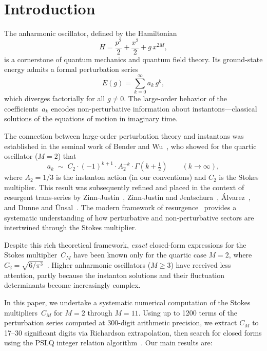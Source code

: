 \documentclass[12pt,a4paper]{article}
\numberwithin{equation}{section}
\theoremstyle{plain}
\theoremstyle{definition}
\theoremstyle{remark}
\begin{document}
\bigskip

\section{Introduction}
\label{sec:intro}

The anharmonic oscillator, defined by the Hamiltonian
\begin{equation}\label{eq:H}
  H = \frac{p^2}{2} + \frac{x^2}{2} + g\,x^{2M},
\end{equation}
is a cornerstone of quantum mechanics and quantum field theory. Its ground-state
energy admits a formal perturbation series
\begin{equation}\label{eq:Eg}
  E(g) = \sum_{k=0}^{\infty} a_k \, g^k,
\end{equation}
which diverges factorially for all $g \ne 0$. The large-order behavior of
the coefficients~$a_k$ encodes non-perturbative information about instantons---classical
solutions of the equations of motion in imaginary time.

The connection between large-order perturbation theory and instantons was
established in the seminal work of Bender and Wu~\cite{BW1969,BW1973}, who
showed for the quartic oscillator ($M=2$) that
\begin{equation}\label{eq:large-order-M2}
  a_k \;\sim\; C_2 \cdot (-1)^{k+1} \cdot A_2^{-k} \cdot \Gamma(k + \tfrac{1}{2})
  \qquad (k \to \infty),
\end{equation}
where $A_2 = 1/3$ is the instanton action (in our conventions) and $C_2$ is
the Stokes multiplier. This result was subsequently refined and placed in the
context of resurgent trans-series by Zinn-Justin~\cite{ZJ2004},
Zinn-Justin and Jentschura~\cite{ZJJ2004}, \'Alvarez~\cite{Alvarez2004},
and Dunne and \"Unsal~\cite{DU2016}. The modern framework of
resurgence~\cite{Dorigoni2019,ABS2019} provides a systematic understanding
of how perturbative and non-perturbative sectors are intertwined through
the Stokes multiplier.

Despite this rich theoretical framework, \emph{exact} closed-form expressions
for the Stokes multiplier~$C_M$ have been known only for the quartic case
$M = 2$, where $C_2 = \sqrt{6/\pi^3}$~\cite{ZJJ2004}. Higher anharmonic
oscillators ($M \ge 3$) have received less attention, partly because the
instanton solutions and their fluctuation determinants become increasingly
complex.

In this paper, we undertake a systematic numerical computation of the
Stokes multipliers~$C_M$ for $M = 2$ through $M = 11$. Using up to 1200
terms of the perturbation series computed at 300-digit arithmetic precision,
we extract $C_M$ to 17--30 significant digits via Richardson extrapolation,
then search for closed forms using the PSLQ integer relation
algorithm~\cite{FergusonBailey}. Our main results are:
\end{document}
